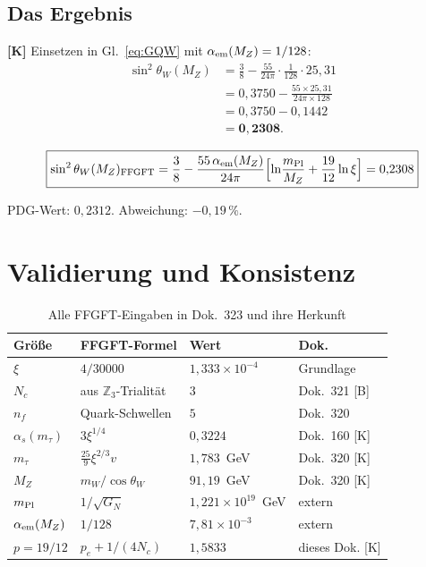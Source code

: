 \subsection{Das Ergebnis}

\textbf{[K]} Einsetzen in Gl.~\eqref{eq:GQW} mit
$\alpha_{\rm em}(M_Z) = 1/128$:
\begin{align}
  \sin^2\theta_W(M_Z)
  &= \frac{3}{8}
   - \frac{55}{24\pi}\cdot\frac{1}{128}
     \cdot 25{,}31 \nonumber\\
  &= 0{,}3750
   - \frac{55 \times 25{,}31}{24\pi \times 128} \nonumber\\
  &= 0{,}3750 - 0{,}1442 \nonumber\\
  &= \mathbf{0{,}2308}.
  \label{eq:result}
\end{align}

\begin{equation}
  \boxed{\sin^2\theta_W(M_Z)_{\rm FFGFT}
  = \frac{3}{8}
  - \frac{55\,\alpha_{\rm em}(M_Z)}{24\pi}
    \Bigl[\ln\!\frac{m_{\rm Pl}}{M_Z}
         + \frac{19}{12}\ln\xi\Bigr]
  = 0{,}2308}
  \label{eq:main2}
\end{equation}

PDG-Wert: $0{,}2312$. Abweichung: $-0{,}19\,\%$.

\section{Validierung und Konsistenz}

\begin{table}[h]
\centering
\caption{Alle FFGFT-Eingaben in Dok.~323 und ihre Herkunft}
\label{tab:eingaben}
\begin{tabular}{llll}
\toprule
Größe & FFGFT-Formel & Wert & Dok. \\
\midrule
$\xi$ & $4/30000$ & $1{,}333\times10^{-4}$ & Grundlage \\
$N_c$ & aus $\mathbb{Z}_3$-Trialität & $3$ & Dok.~321 [B] \\
$n_f$ & Quark-Schwellen & $5$ & Dok.~320 \\
$\alpha_s(m_\tau)$ & $3\xi^{1/4}$ & $0{,}3224$ & Dok.~160 [K] \\
$m_\tau$ & $\tfrac{25}{9}\xi^{2/3}v$ & $1{,}783$~GeV & Dok.~320 [K] \\
$M_Z$ & $m_W/\!\cos\theta_W$ & $91{,}19$~GeV & Dok.~320 [K] \\
$m_{\rm Pl}$ & $1/\sqrt{G_N}$ & $1{,}221\times10^{19}$~GeV & extern \\
$\alpha_{\rm em}(M_Z)$ & $1/128$ & $7{,}81\times10^{-3}$ & extern \\
$p = 19/12$ & $p_e + 1/(4N_c)$ & $1{,}5833$ & dieses Dok. [K] \\
\bottomrule
\end{tabular}
\end{table}

